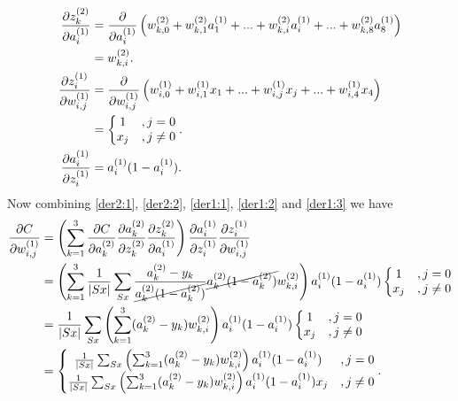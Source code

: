 \documentclass[a4paper,12pt,notitlepage]{article}
\begin{document}
\begin{subequations}
\begin{align}
\frac{\partial z_{k}^{(2)}}{\partial a_{i}^{(1)}}
 & = \frac{\partial }{\partial a_{i}^{(1)}}\left(w_{k,0}^{(2)}+w_{k,1}^{(2)}a_{1}^{(1)}+...+w_{k,i}^{(2)}a_{i}^{(1)}+...+w_{k,8}^{(2)}a_{8}^{(1)} \right )  \notag \\
 & = w_{k,i}^{(2)}. \label{der1:1}\\
\frac{\partial z_{i}^{(1)}}{\partial w_{i,j}^{(1)}}
 & = \frac{\partial }{\partial w_{i,j}^{(1)}}\left(w_{i,0}^{(1)}+w_{i,1}^{(1)}x_{1}+...+w_{i,j}^{(1)}x_{j}+...+w_{i,4}^{(1)}x_{4} \right ) \notag \\
 & =  \left\{\begin{matrix}
1&, j = 0\\ 
x_{j}&, j \neq 0
\end{matrix}\right.. \label{der1:2}\\
\frac{\partial a_{i}^{(1)}}{\partial z_{i}^{(1)}}
 & =a_{i}^{(1)}(1-a_{i}^{(1)}). \label{der1:3}
\end{align}
\end{subequations}
Now combining \eqref{der2:1}, \eqref{der2:2}, \eqref{der1:1}, \eqref{der1:2} and \eqref{der1:3} we have
\begin{equation} \label{der1}
\begin{split}
\frac{\partial C}{\partial w_{i,j}^{(1)}}
&=\left( \sum_{k=1}^{3}\frac{\partial C}{\partial a_{k}^{(2)}}\frac{\partial a_{k}^{(2)}}{\partial z_{k}^{(2)}}\frac{\partial z_{k}^{(2)}}{\partial a_{i}^{(1)}}\right )\frac{\partial a_{i}^{(1)}}{\partial z_{i}^{(1)}}\frac{\partial z_{i}^{(1)}}{\partial w_{i,j}^{(1)}}\\
&=\left(\sum_{k=1}^{3} \frac{1}{|Sx|}\sum_{Sx} \frac{a_{k}^{(2)}-y_{k}}{\cancel{a_{k}^{(2)}(1-a_{k}^{(2)})}}\cancel{a_{k}^{(2)}(1-a_{k}^{(2)})}w_{k,i}^{(2)}\right )a_{i}^{(1)}(1-a_{i}^{(1)})\left\{\begin{matrix}
1&, j = 0\\ 
x_{j}&, j \neq 0
\end{matrix}\right.\\
&=\frac{1}{|Sx|}\sum_{Sx}\left(\sum_{k=1}^{3} (a_{k}^{(2)}-y_{k})w_{k,i}^{(2)}\right )a_{i}^{(1)}(1-a_{i}^{(1)})\left\{\begin{matrix}
1&, j = 0\\ 
x_{j}&, j \neq 0
\end{matrix}\right.\\
&=\left\{\begin{matrix}
\frac{1}{|Sx|}\sum_{Sx}\left(\sum_{k=1}^{3} (a_{k}^{(2)}-y_{k})w_{k,i}^{(2)}\right )a_{i}^{(1)}(1-a_{i}^{(1)})&, j = 0\\ 
\frac{1}{|Sx|}\sum_{Sx}\left(\sum_{k=1}^{3} (a_{k}^{(2)}-y_{k})w_{k,i}^{(2)}\right )a_{i}^{(1)}(1-a_{i}^{(1)})x_{j}&, j \neq 0
\end{matrix}\right..
\end{split}
\end{equation}
\end{document}
